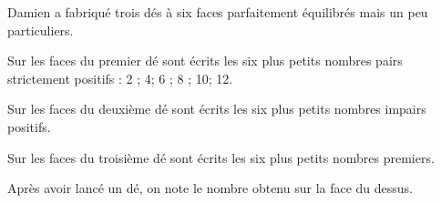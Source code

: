 \documentclass[10pt]{article}
\begin{document}
\setlength\parindent{0mm}
\pagestyle{fancy}
\thispagestyle{empty}
    
    
    




\medskip

Damien a fabriqué trois dés à six faces parfaitement équilibrés mais un peu particuliers.

Sur les faces du premier dé sont écrits les six plus petits nombres pairs strictement positifs : 2 ; 4; 6 ; 8 ; 10; 12.

Sur les faces du deuxième dé sont écrits les six plus petits nombres impairs positifs.

Sur les faces du troisième dé sont écrits les six plus petits nombres premiers.

Après avoir lancé un dé, on note le nombre obtenu sur la face du dessus.

\medskip
\end{document}
